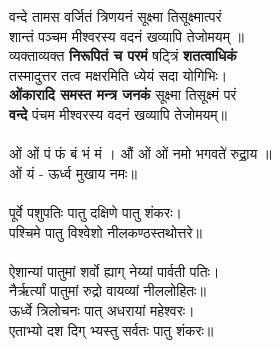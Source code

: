 वन्दे तामस वर्जितं त्रिणयनं सूक्ष्मा तिसूक्ष्मात्परं\\
शान्तं पञ्चम मीश्वरस्य वदनं खव्यापि तेजोमयम् ॥\\
{\small
व्यक्ताव्यक्त \textbf{निरूपितं च परमं} षट्त्रिं \textbf{शतत्वाधिकं}\\
तस्मादुत्तर तत्व मक्षरमिति ध्येयं सदा योगिभिः।\\
\textbf{ओंकारादि समस्त मन्त्र जनकं} सूक्ष्मा तिसूक्ष्मं परं\\
\textbf{वन्दे} पंचम मीश्वरस्य वदनं खव्यापि तेजोमयम्॥\\
}
\\
ओं ओं पं फं बं भं मं । औं ओं ओं नमो भगवते॑ रुद्रा॒य ॥\\
ओं यं - ऊर्ध्व मुखाय नमः॥\\
\\
पूर्वे पशुपतिः पातु दक्षिणे पातु शंकरः।\\
पश्चिमे पातु विश्वेशो नीलकण्ठस्तथोत्तरे॥\\
\\
ऐशान्यां पातुमां शर्वो ह्याग् नेय्यां पार्वती पतिः।\\
नैर्ऋर्त्यां पातुमां रुद्रो वायव्यां नीललोहितः॥\\
ऊर्ध्वे त्रिलोचनः पात् अधरायां महेश्वरः।\\
एताभ्यो दश दिग् भ्यस्तु सर्वतः पातु शंकरः॥\\
